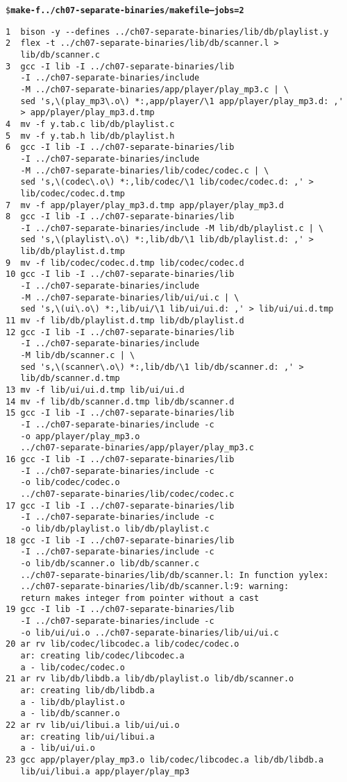 {\footnotesize
\begin{alltt}
\$ \textbf{make -f ../ch07-separate-binaries/makefile --jobs=2}
\end{alltt}
\begin{verbatim}
1  bison -y --defines ../ch07-separate-binaries/lib/db/playlist.y
2  flex -t ../ch07-separate-binaries/lib/db/scanner.l >
   lib/db/scanner.c
3  gcc -I lib -I ../ch07-separate-binaries/lib
   -I ../ch07-separate-binaries/include
   -M ../ch07-separate-binaries/app/player/play_mp3.c | \
   sed 's,\(play_mp3\.o\) *:,app/player/\1 app/player/play_mp3.d: ,'
   > app/player/play_mp3.d.tmp
4  mv -f y.tab.c lib/db/playlist.c
5  mv -f y.tab.h lib/db/playlist.h
6  gcc -I lib -I ../ch07-separate-binaries/lib
   -I ../ch07-separate-binaries/include
   -M ../ch07-separate-binaries/lib/codec/codec.c | \
   sed 's,\(codec\.o\) *:,lib/codec/\1 lib/codec/codec.d: ,' >
   lib/codec/codec.d.tmp
7  mv -f app/player/play_mp3.d.tmp app/player/play_mp3.d
8  gcc -I lib -I ../ch07-separate-binaries/lib
   -I ../ch07-separate-binaries/include -M lib/db/playlist.c | \
   sed 's,\(playlist\.o\) *:,lib/db/\1 lib/db/playlist.d: ,' >
   lib/db/playlist.d.tmp
9  mv -f lib/codec/codec.d.tmp lib/codec/codec.d
10 gcc -I lib -I ../ch07-separate-binaries/lib
   -I ../ch07-separate-binaries/include
   -M ../ch07-separate-binaries/lib/ui/ui.c | \
   sed 's,\(ui\.o\) *:,lib/ui/\1 lib/ui/ui.d: ,' > lib/ui/ui.d.tmp
11 mv -f lib/db/playlist.d.tmp lib/db/playlist.d
12 gcc -I lib -I ../ch07-separate-binaries/lib
   -I ../ch07-separate-binaries/include
   -M lib/db/scanner.c | \
   sed 's,\(scanner\.o\) *:,lib/db/\1 lib/db/scanner.d: ,' >
   lib/db/scanner.d.tmp
13 mv -f lib/ui/ui.d.tmp lib/ui/ui.d
14 mv -f lib/db/scanner.d.tmp lib/db/scanner.d
15 gcc -I lib -I ../ch07-separate-binaries/lib
   -I ../ch07-separate-binaries/include -c
   -o app/player/play_mp3.o
   ../ch07-separate-binaries/app/player/play_mp3.c
16 gcc -I lib -I ../ch07-separate-binaries/lib
   -I ../ch07-separate-binaries/include -c
   -o lib/codec/codec.o
   ../ch07-separate-binaries/lib/codec/codec.c
17 gcc -I lib -I ../ch07-separate-binaries/lib
   -I ../ch07-separate-binaries/include -c
   -o lib/db/playlist.o lib/db/playlist.c
18 gcc -I lib -I ../ch07-separate-binaries/lib
   -I ../ch07-separate-binaries/include -c
   -o lib/db/scanner.o lib/db/scanner.c
   ../ch07-separate-binaries/lib/db/scanner.l: In function yylex:
   ../ch07-separate-binaries/lib/db/scanner.l:9: warning:
   return makes integer from pointer without a cast
19 gcc -I lib -I ../ch07-separate-binaries/lib
   -I ../ch07-separate-binaries/include -c
   -o lib/ui/ui.o ../ch07-separate-binaries/lib/ui/ui.c
20 ar rv lib/codec/libcodec.a lib/codec/codec.o
   ar: creating lib/codec/libcodec.a
   a - lib/codec/codec.o
21 ar rv lib/db/libdb.a lib/db/playlist.o lib/db/scanner.o
   ar: creating lib/db/libdb.a
   a - lib/db/playlist.o
   a - lib/db/scanner.o
22 ar rv lib/ui/libui.a lib/ui/ui.o
   ar: creating lib/ui/libui.a
   a - lib/ui/ui.o
23 gcc app/player/play_mp3.o lib/codec/libcodec.a lib/db/libdb.a
   lib/ui/libui.a app/player/play_mp3
\end{verbatim}
}

